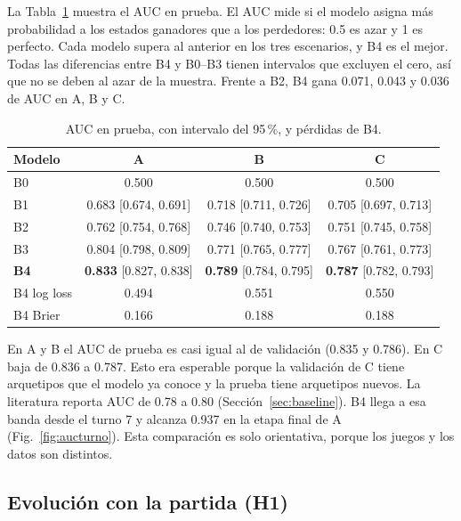 La Tabla~\ref{tab:resultados} muestra el AUC en prueba. El AUC mide si el
modelo asigna más probabilidad a los estados ganadores que a los
perdedores: 0.5 es azar y 1 es perfecto. Cada modelo supera al anterior en
los tres escenarios, y B4 es el mejor. Todas las diferencias entre B4 y
B0--B3 tienen intervalos que excluyen el cero, así que no se deben al azar
de la muestra. Frente a B2, B4 gana 0.071, 0.043 y 0.036 de AUC en A, B y
C.

\begin{table}[!t]
\centering
\caption{AUC en prueba, con intervalo del 95\,\%, y pérdidas de B4.}
\label{tab:resultados}
\footnotesize
\setlength{\tabcolsep}{3pt}
\begin{tabular}{@{}lccc@{}}
\toprule
\textbf{Modelo} & \textbf{A} & \textbf{B} & \textbf{C}\\
\midrule
B0 & 0.500 & 0.500 & 0.500\\
B1 & 0.683 {\scriptsize[0.674, 0.691]} & 0.718 {\scriptsize[0.711, 0.726]} & 0.705 {\scriptsize[0.697, 0.713]}\\
B2 & 0.762 {\scriptsize[0.754, 0.768]} & 0.746 {\scriptsize[0.740, 0.753]} & 0.751 {\scriptsize[0.745, 0.758]}\\
B3 & 0.804 {\scriptsize[0.798, 0.809]} & 0.771 {\scriptsize[0.765, 0.777]} & 0.767 {\scriptsize[0.761, 0.773]}\\
\textbf{B4} & \textbf{0.833} {\scriptsize[0.827, 0.838]} & \textbf{0.789} {\scriptsize[0.784, 0.795]} & \textbf{0.787} {\scriptsize[0.782, 0.793]}\\
\midrule
B4 log loss & 0.494 & 0.551 & 0.550\\
B4 Brier & 0.166 & 0.188 & 0.188\\
\bottomrule
\end{tabular}
\end{table}

En A y B el AUC de prueba es casi igual al de validación (0.835 y 0.786).
En C baja de 0.836 a 0.787. Esto era esperable porque la validación de C tiene
arquetipos que el modelo ya conoce y la prueba tiene arquetipos nuevos. La
literatura reporta AUC de 0.78 a 0.80 (Sección~\ref{sec:baseline}). B4 llega
a esa banda desde el turno 7 y alcanza 0.937 en la etapa final de A
(Fig.~\ref{fig:aucturno}). Esta comparación es solo orientativa, porque los
juegos y los datos son distintos.

\subsection{Evolución con la partida (H1)}
\label{subsec:resh1}

